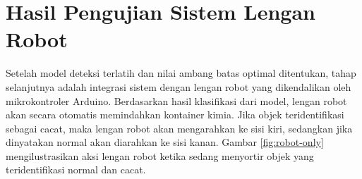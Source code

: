 \vspace{1em}

\section{Hasil Pengujian Sistem Lengan Robot}
\noindent
Setelah model deteksi terlatih dan nilai ambang batas optimal
ditentukan, tahap selanjutnya adalah integrasi sistem dengan lengan
robot yang dikendalikan oleh mikrokontroler Arduino. Berdasarkan
hasil klasifikasi dari model, lengan robot  akan secara otomatis
memindahkan kontainer kimia. Jika objek teridentifikasi sebagai
cacat, maka lengan robot akan mengarahkan ke sisi kiri, sedangkan
jika dinyatakan normal akan diarahkan ke sisi kanan. Gambar
\ref{fig:robot-only} mengilustrasikan aksi lengan robot
ketika sedang menyortir objek yang teridentifikasi normal dan cacat.

